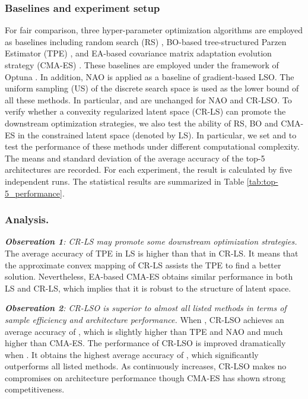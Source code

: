 \documentclass[10pt,twocolumn,letterpaper]{article}
\begin{document}
\subsubsection{Baselines and experiment setup}
For fair comparison, three hyper-parameter optimization algorithms are employed as baselines including random search (RS) \cite{bergstra2012random}, BO-based tree-structured Parzen Estimator (TPE) \cite{bergstra2013making,ozaki2020multiobjective}, and EA-based covariance matrix adaptation evolution strategy (CMA-ES) \cite{nomura2021warm, hansen2016cma}. These baselines are employed under the framework of Optuna \cite{akiba2019optuna}. In addition, NAO \cite{luo2018neural} is applied as a baseline of gradient-based LSO. The uniform sampling (US) of the discrete search space is used as the lower bound of all these methods. In particular,  and  are unchanged for NAO and CR-LSO. To verify whether a convexity regularized latent space (CR-LS) can promote the downstream optimization strategies, we also test the ability of RS, BO and CMA-ES in the constrained latent space (denoted by LS). In particular, we set  and  to test the performance of these methods under different computational complexity. The means and standard deviation of the average accuracy of the top-5 architectures are recorded. For each experiment, the result is calculated by five independent runs. The statistical results are summarized in Table \ref{tab:top-5_performance}.
\subsubsection{Analysis.} 
\emph{\textbf{Observation 1}: CR-LS may promote some downstream optimization strategies.} The average accuracy of TPE in LS is higher than that in CR-LS. It means that the approximate convex mapping of CR-LS assists the TPE to find a better solution. Nevertheless, EA-based CMA-ES obtains similar performance in both LS and CR-LS, which implies that it is robust to the structure of latent space.

\emph{\textbf{Observation 2}: CR-LSO is superior to almost all listed methods in terms of sample efficiency and architecture performance.} When , CR-LSO achieves an average accuracy of , which is slightly higher than TPE and NAO and much higher than CMA-ES. The performance of CR-LSO is improved dramatically when . It obtains the highest average accuracy of , which significantly outperforms all listed methods. As  continuously increases, CR-LSO makes no compromises on architecture performance though CMA-ES has shown strong competitiveness. 
\end{document}
